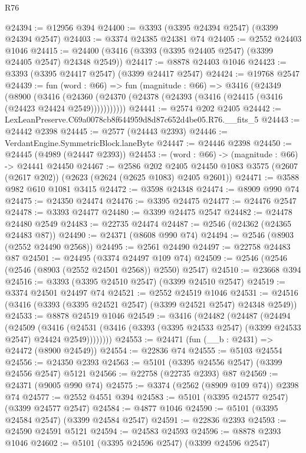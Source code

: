 \begin{lexlean}{R76}
\begin{coremodule}
@24394 := @12956 @394
@24400 := @3393 (@3395 @24394 @2547) (@3399 @24394 @2547)
@24403 := @3374 @24385 @24381 @74
@24405 := @2552 @24403 @1046
@24415 := @24400 (@3416 (@3393 (@3395 @24405 @2547) (@3399 @24405 @2547) @24348 @2549))
@24417 := @8878 @24403 @1046
@24423 := @3393 (@3395 @24417 @2547) (@3399 @24417 @2547)
@24424 := @19768 @2547
@24439 := fun (word : @66) =>
  fun (magnitude : @66) =>
  @3416
    (@24349
      (@8900
        (@3416 (@24360 (@24370 (@24378 (@24393 (@3416 (@24415 (@3416 (@24423 @24424 @2549)))))))))))
@24441 := @2574 @202 @2405
@24442 := LexLeanPreserve.C69a0078cb8f644959d8d87c652d4be05.R76.__fits_5
@24443 := @24442 @2398
@24445 := @2577 (@24443 @2393)
@24446 := VerdantEngine.SymmetricBlock.laneByte
@24447 := @24446 @2398
@24450 := @24445 (@4989 (@24447 @2393))
@24453 := (word : @66) -> (magnitude : @66) -> @24441 @24450
@24467 := @2586
    @202
    @2405
    @24450
    @1083
    @3575
    (@2607 (@2617 @202))
    (@2623 (@2624 (@2625 @1083) @2405 @2601))
@24471 := @3588 @982 @610 @1081 @3415
@24472 := @3598 @24348
@24474 := @8909 @990 @74
@24475 := @24350 @24474
@24476 := @3395 @24475
@24477 := @24476 @2547
@24478 := @3393 @24477
@24480 := @3399 @24475 @2547
@24482 := @24478 @24480 @2549
@24483 := @22735 @24474
@24487 := @2546 (@24362 (@24365 @24483 @87))
@24490 := @24371 (@8608 @990 @74)
@24494 := @2546 (@8903 (@2552 @24490 @2568))
@24495 := @2561 @24490
@24497 := @22758 @24483 @87
@24501 := @24495 (@3374 @24497 @109 @74)
@24509 := @2546 (@2546 (@2546 (@8903 (@2552 @24501 @2568)) @2550) @2547)
@24510 := @23668 @394
@24516 := @3393 (@3395 @24510 @2547) (@3399 @24510 @2547)
@24519 := @3374 @24501 @24497 @74
@24521 := @2552 @24519 @1046
@24531 := @24516 (@3416 (@3393 (@3395 @24521 @2547) (@3399 @24521 @2547) @24348 @2549))
@24533 := @8878 @24519 @1046
@24549 := @3416
    (@24482
      (@24487
        (@24494
          (@24509
            (@3416
              (@24531 (@3416 (@3393 (@3395 @24533 @2547) (@3399 @24533 @2547) @24424 @2549))))))))
@24553 := @24471 (fun (__b : @2431) => @24472 (@8900 @24549))
@24554 := @22836 @74
@24555 := @5103 @24554
@24556 := @24350 @2393
@24563 := @5101 (@3395 @24556 @2547) (@3399 @24556 @2547) @5121
@24566 := @22758 (@22735 @2393) @87
@24569 := @24371 (@9005 @990 @74)
@24575 := @3374 (@2562 (@8909 @109 @74)) @2398 @74
@24577 := @2552 @4551 @394
@24583 := @5101 (@3395 @24577 @2547) (@3399 @24577 @2547)
@24584 := @4877 @1046
@24590 := @5101 (@3395 @24584 @2547) (@3399 @24584 @2547)
@24591 := @22836 @2393
@24593 := @24590 @24591 @5121
@24594 := @24583 @24593
@24596 := @8878 @2393 @1046
@24602 := @5101 (@3395 @24596 @2547) (@3399 @24596 @2547)

\end{coremodule}
\end{lexlean}
